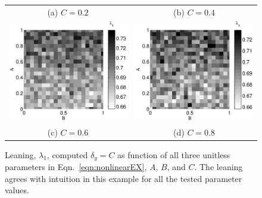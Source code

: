 \documentclass[twocolumn,aps,pre,groupedaddress]{revtex4-1}
\begin{document}
\begin{figure}[ht]
\begin{tabular}{cc}
(a) $C=0.2$ & (b) $C=0.4$ \\
\includegraphics[scale=0.30]{NonlinearCyclicexample_BxytolC06.eps} &
\includegraphics[scale=0.30]{NonlinearCyclicexample_BxytolC08.eps} \\
(c) $C=0.6$ & (d) $C=0.8$ \\
\end{tabular}
\caption{Leaning, $\lambda_1$, computed $\delta_y=C$ as function of all three unitless parameters in Eqn.\ \ref{eqn:nonlinearEX}, $A$, $B$, and $C$.  The leaning agrees with intuition in this example for all the tested parameter values.}
\label{fig:nonlin1}
\end{figure}
\end{document}
